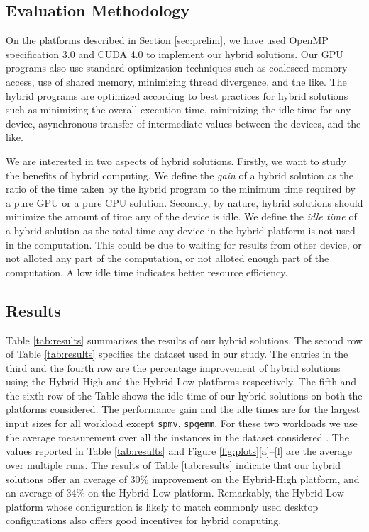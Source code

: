 \documentclass[11pt]{article}
\newcommand{\sgemm} {{\tt spgemm}}
\newcommand{\spmv} {{\tt spmv}}
\begin{document}
\subsection{Evaluation Methodology}
On the platforms described in Section \ref{sec:prelim}, we have used  OpenMP
specification 3.0 \cite{openmp} and CUDA 4.0 \cite{cuda} to implement
our hybrid solutions. Our GPU
programs also use standard optimization techniques such as coalesced
memory access, use of shared memory, minimizing thread divergence, and
the like. The hybrid programs are optimized according to best 
practices for hybrid solutions such as minimizing the overall execution 
time, minimizing the idle time for any device, asynchronous transfer 
of intermediate values between the devices, and the like.  

We are interested in two aspects of hybrid solutions. Firstly, we want
to study the benefits of hybrid computing. We define the {\em gain} of a
hybrid solution as the ratio of the  time taken by the hybrid program to the
minimum time required by a pure GPU or a pure CPU solution. 
Secondly, by nature, hybrid solutions should
minimize the amount of time any of the device is idle. We  define the 
{\em idle time} of a hybrid solution as the total time any device in the hybrid platform
is not used in the computation. This could be due to waiting for results
from other device, or not alloted any part of the computation, or not
alloted enough part of the computation.  A low idle time
indicates better resource efficiency. 


\subsection{Results}
Table \ref{tab:results} summarizes the results of our hybrid solutions.
The second row of Table \ref{tab:results} specifies the dataset used in our
study. The entries in the third and the fourth row are the percentage
improvement of hybrid solutions using the Hybrid-High and the Hybrid-Low
platforms respectively.  The fifth and the sixth row of the Table
shows the idle time of our hybrid solutions on both the platforms
considered. The performance gain and the idle times are for the largest
input sizes for all workload except \spmv, \sgemm. For these two workloads
we  use the average measurement over all the instances in the dataset
considered \cite{vuduc07}.
The values reported in Table \ref{tab:results} and Figure
\ref{fig:plots}[a]--[l] are the average over multiple runs. The results of
Table \ref{tab:results} indicate that our hybrid solutions offer an average
of 30\% improvement on the Hybrid-High platform, and an average of 34\% on
the Hybrid-Low platform. Remarkably, the Hybrid-Low platform whose
configuration is likely to match commonly used desktop configurations also
offers good incentives for hybrid computing. 
\end{document}
